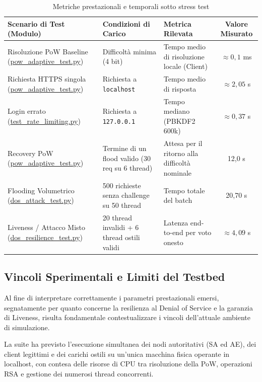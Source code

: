 \documentclass[12pt,a4paper]{article}
\begin{document}
\begin{table}[!ht]
\centering
\small
\begin{tabularx}{\textwidth}{Y Y Y c}
\toprule
\textbf{Scenario di Test (Modulo)} & \textbf{Condizioni di Carico} & \textbf{Metrica Rilevata} & \textbf{Valore Misurato} \\
\midrule
Risoluzione PoW Baseline (\url{pow_adaptive_test.py}) & Difficoltà minima (4 bit) & Tempo medio di risoluzione locale (Client) & $\approx 0,1$ ms \\
\midrule
Richiesta HTTPS singola (\url{pow_adaptive_test.py}) & Richiesta a \texttt{localhost} & Tempo medio di risposta & $\approx 2,05$ s \\
\midrule
Login errato (\url{test_rate_limiting.py}) & Richiesta a \texttt{127.0.0.1} & Tempo mediano (PBKDF2 600k) & $\approx 0,37$ s \\
\midrule
Recovery PoW (\url{pow_adaptive_test.py}) & Termine di un flood valido (30 req su 6 thread) & Attesa per il ritorno alla difficoltà nominale & 12,0 s \\
\midrule
Flooding Volumetrico (\url{dos_attack_test.py}) & 500 richieste senza challenge su 50 thread & Tempo totale del batch & 20,70 s \\
\midrule
Liveness / Attacco Misto (\url{dos_resilience_test.py}) & 20 thread invalidi + 6 thread ostili validi & Latenza end-to-end per voto onesto & $\approx 4,09$ s \\
\bottomrule
\end{tabularx}
\caption{Metriche prestazionali e temporali sotto stress test}
\label{tab:metriche_stress}
\end{table}

\subsection{Vincoli Sperimentali e Limiti del Testbed}

Al fine di interpretare correttamente i parametri prestazionali emersi, segnatamente per quanto concerne la resilienza al Denial of Service e la garanzia di Liveness, risulta fondamentale contestualizzare i vincoli dell'attuale ambiente di simulazione.

La suite ha previsto l'esecuzione simultanea dei nodi autoritativi (SA ed AE), dei client legittimi e dei carichi ostili su un'unica macchina fisica operante in localhost, con contesa delle risorse di CPU tra risoluzione della PoW, operazioni RSA e gestione dei numerosi thread concorrenti.
\end{document}
